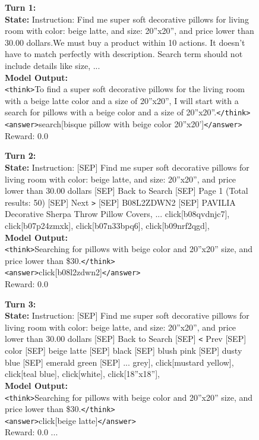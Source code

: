 \begin{figure}[t]
\begin{tcolorbox}[colback=gray!2, colframe=black, boxrule=0.5pt, arc=2pt, width=0.95\linewidth, title=0.5B WebShop – Multi-Turn Rollout]
\textbf{Turn 1:} \\
\textbf{State:}
Instruction: Find me super soft decorative pillows for living room with color: beige latte, and size: 20''x20'', and price lower than 30.00 dollars.We must buy a product within 10 actions. It doesn't have to match perfectly with description.
Search term should not include details like size, ...\\
\textbf{Model Output:} \\
\texttt{<think>}To find a super soft decorative pillows for the living room with a beige latte color and a size of 20''x20'', I will start with a search for pillows with a beige color and a size of 20''x20''.\texttt{</think>} \\
\texttt{<answer>}search[bisque pillow with beige color 20''x20']\texttt{</answer>} \\
Reward: 0.0


\vspace{4pt}
\textbf{Turn 2:} \\
\textbf{State:}
Instruction: [SEP] Find me super soft decorative pillows for living room with color: beige latte, and size: 20''x20'', and price lower than 30.00 dollars [SEP] Back to Search [SEP] Page 1 (Total results: 50) [SEP] Next \texttt{>} [SEP] B08L2ZDWN2 [SEP] PAVILIA Decorative Sherpa Throw Pillow Covers, ... click[b08qvdnjc7], click[b07p24zmxk], click[b07n33bpq6], click[b09nrf2qgd],\\
\textbf{Model Output:} \\
\texttt{<think>}Searching for pillows with beige color and 20''x20'' size, and price lower than \$30.\texttt{</think>} \\
\texttt{<answer>}click[b08l2zdwn2]\texttt{</answer>} \\
Reward: 0.0


\vspace{4pt}
\textbf{Turn 3:} \\
\textbf{State:}
Instruction: [SEP] Find me super soft decorative pillows for living room with color: beige latte, and size: 20''x20'', and price lower than 30.00 dollars [SEP] Back to Search [SEP] \texttt{<} Prev [SEP] color [SEP] beige latte [SEP] black [SEP] blush pink [SEP] dusty blue [SEP] emerald green [SEP] ... grey], click[mustard yellow], click[teal blue], click[white], click[18''x18''],\\
\textbf{Model Output:} \\
\texttt{<think>}Searching for pillows with beige color and 20''x20'' size, and price lower than \$30.\texttt{</think>} \\
\texttt{<answer>}click[beige latte]\texttt{</answer>} \\
Reward: 0.0
...


\end{tcolorbox}
\end{figure}

